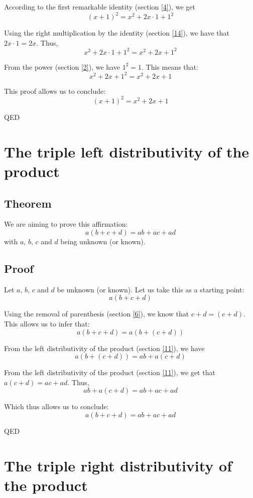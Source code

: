 \documentclass[a4paper]{article}
\begin{document}
According to the first remarkable identity (section \ref{4}), we get
\[\left(x+1\right)^2=x^2+2x\cdot1+1^2\]

Using the right multiplication by the identity (section \ref{14}), we have that $2x\cdot1=2x$. Thus,
\[x^2+2x\cdot1+1^2=x^2+2x+1^2\]

From the power (section \ref{2}), we have $1^2=1$. This means that:
\[x^2+2x+1^2=x^2+2x+1\]

This proof allows us to conclude:
\[\left(x+1\right)^2 = x^2+2x+1\]
\begin{flushright}
QED
\end{flushright}



\section{The triple left distributivity of the product\label{16}}
\subsection{Theorem}
We are aiming to prove this affirmation:
\[a\left(b + c + d\right) = ab + ac + ad\]
with $a$, $b$, $c$ and $d$ being unknown (or known).\subsection{Proof}
Let $a$, $b$, $c$ and $d$ be unknown (or known). Let us take this as a starting point:
\[a\left(b+c+d\right)\]

Using the removal of parenthesis (section \ref{6}), we know that $c+d=\left(c+d\right)$. This allows us to infer that:
\[a\left(b+c+d\right)=a\left(b+\left(c+d\right)\right)\]

From the left distributivity of the product (section \ref{11}), we have
\[a\left(b+\left(c+d\right)\right)=ab+a\left(c+d\right)\]

From the left distributivity of the product (section \ref{11}), we get that $a\left(c+d\right)=ac+ad$. Thus,
\[ab+a\left(c+d\right)=ab+ac+ad\]

Which thus allows us to conclude:
\[a\left(b+c+d\right) = ab+ac+ad\]
\begin{flushright}
QED
\end{flushright}



\section{The triple right distributivity of the product\label{15}}
\end{document}
